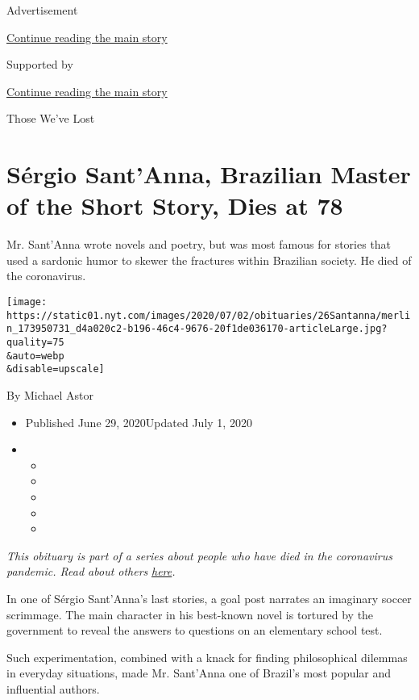 Advertisement

\protect\hyperlink{after-top}{Continue reading the main story}

Supported by

\protect\hyperlink{after-sponsor}{Continue reading the main story}

Those We've Lost

\hypertarget{suxe9rgio-santanna-brazilian-master-of-the-short-story-dies-at-78}{%
\section{Sérgio Sant'Anna, Brazilian Master of the Short Story, Dies at
78}\label{suxe9rgio-santanna-brazilian-master-of-the-short-story-dies-at-78}}

Mr. Sant'Anna wrote novels and poetry, but was most famous for stories
that used a sardonic humor to skewer the fractures within Brazilian
society. He died of the coronavirus.

\texttt{[image: https://static01.nyt.com/images/2020/07/02/obituaries/26Santanna/merlin\_173950731\_d4a020c2-b196-46c4-9676-20f1de036170-articleLarge.jpg?quality=75\\\&auto=webp\\\&disable=upscale]}

By Michael Astor

\begin{itemize}
\item
  Published June 29, 2020Updated July 1, 2020
\item
  \begin{itemize}
  \item
  \item
  \item
  \item
  \item
  \end{itemize}
\end{itemize}

\emph{This obituary is part of a series about people who have died in
the coronavirus pandemic. Read about others}
\href{https://www.nytimes.com/interactive/2020/obituaries/people-died-coronavirus-obituaries.html}{\emph{here}}\emph{.}

In one of Sérgio Sant'Anna's last stories, a goal post narrates an
imaginary soccer scrimmage. The main character in his best-known novel
is tortured by the government to reveal the answers to questions on an
elementary school test.

Such experimentation, combined with a knack for finding philosophical
dilemmas in everyday situations, made Mr. Sant'Anna one of Brazil's most
popular and influential authors.

